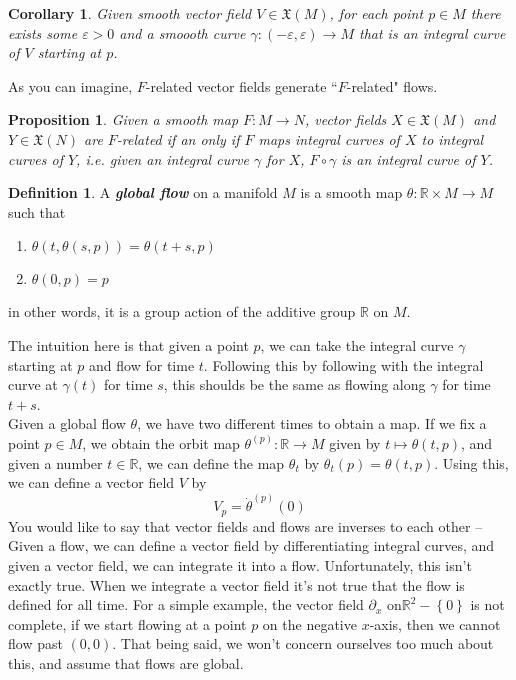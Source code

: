 \documentclass[psamsfonts]{amsart}
\newtheorem{cor}[thm]{Corollary}
\newtheorem{prop}[thm]{Proposition}
\theoremstyle{definition}
\newtheorem{defn}[thm]{Definition}
\theoremstyle{remark}
\newcommand{\R}{\mathbb{R}}
\newcommand{\ib}[1]{\textbf{\textit{#1}}}
\newcommand{\set}[1]{\left\lbrace #1 \right\rbrace}
\begin{document}
%
\begin{cor}
Given smooth vector field $V \in \mathfrak{X}(M)$, for each point $p \in M$ there
exists some $\varepsilon > 0$ and a smoooth curve
$\gamma : (-\varepsilon, \varepsilon) \to M$ that is an integral curve of $V$
starting at $p$.
\end{cor}
%
As you can imagine, $F$-related vector fields generate ``$F$-related" flows.
%
\begin{prop}
Given a smooth map $F: M \to N$, vector fields $X \in \mathfrak{X}(M)$ and
$Y \in \mathfrak{X}(N)$ are $F$-related if an only if $F$ maps integral
curves of $X$ to integral curves of $Y$, i.e. given an integral curve $\gamma$
for $X$, $F \circ \gamma$ is an integral curve of $Y$.
\end{prop}
%
\begin{defn}
A \ib{global flow} on a manifold $M$ is a smooth map $\theta : \R \times M \to M$
such that
\begin{enumerate}
  \item $\theta(t, \theta(s,p)) = \theta(t+s, p)$ \\
  \item $\theta(0,p) = p$
\end{enumerate}
in other words, it is a group action of the additive group $\R$ on $M$.
\end{defn}
%
The intuition here is that given a point $p$, we can take the integral curve $\gamma$
starting at $p$ and flow for time $t$. Following this by following with the integral curve
at $\gamma(t)$ for time $s$, this shoulds be the same as flowing along $\gamma$
for time $t+s$. \\

Given a global flow $\theta$, we have two different times to obtain a map. If we fix
a point $p\in M$, we obtain the orbit map $\theta^{(p)} : \R \to M$ given
by $t \mapsto \theta(t,p)$, and given a number $t \in \R$, we can
define the map $\theta_t$ by $\theta_t(p) = \theta(t,p)$. Using this,
we can define a vector field $V$ by
\[
V_p = \dot{\theta}^{(p)}(0)
\]
You would like to say that vector fields and flows are inverses to each other --
Given a flow, we can define a vector field by differentiating integral curves,
and given a vector field, we can integrate it into a flow. Unfortunately,
this isn't exactly true. When we integrate a vector field it's not true
that the flow is defined for all time. For a simple example, the vector
field $\partial_x$ on$\R^2 - \set{0}$ is not complete, if we start flowing
at a point $p$ on the negative $x$-axis, then we cannot flow past $(0,0)$. That
being said, we won't concern ourselves too much about this, and assume that
flows are global. \\
\end{document}

